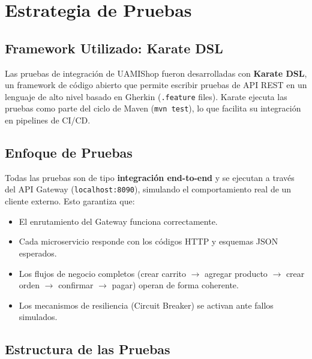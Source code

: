 \documentclass[12pt,a4paper]{article}
\begin{document}
\tableofcontents
\newpage

\section{Estrategia de Pruebas}

\subsection{Framework Utilizado: Karate DSL}

Las pruebas de integraci\'on de UAMIShop fueron desarrolladas con \textbf{Karate DSL},
un framework de c\'odigo abierto que permite escribir pruebas de API REST en un lenguaje
de alto nivel basado en Gherkin (\texttt{.feature} files). Karate ejecuta las pruebas
como parte del ciclo de Maven (\texttt{mvn test}), lo que facilita su integraci\'on en
pipelines de CI/CD.

\subsection{Enfoque de Pruebas}

Todas las pruebas son de tipo \textbf{integraci\'on end-to-end} y se ejecutan a trav\'es
del API Gateway (\texttt{localhost:8090}), simulando el comportamiento real de un cliente
externo. Esto garantiza que:

\begin{itemize}
  \item El enrutamiento del Gateway funciona correctamente.
  \item Cada microservicio responde con los c\'odigos HTTP y esquemas JSON esperados.
  \item Los flujos de negocio completos (crear carrito $\rightarrow$ agregar producto
        $\rightarrow$ crear orden $\rightarrow$ confirmar $\rightarrow$ pagar) operan
        de forma coherente.
  \item Los mecanismos de resiliencia (Circuit Breaker) se activan ante fallos simulados.
\end{itemize}

\subsection{Estructura de las Pruebas}
\end{document}
